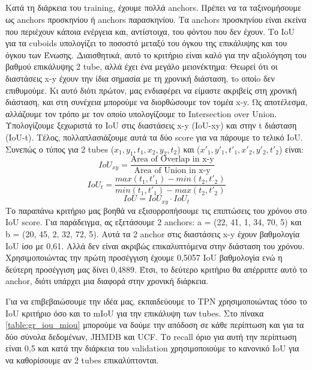 \subsection{ }
Κατά τη διάρκεια του \en training\gr, έχουμε πολλά \en anchors\gr. Πρέπει να τα ταξινομήσουμε ως \en anchors  \gr προσκηνίου ή
\en anchors \gr παρασκηνίου. Τα \en anchors \gr προσκηνίου είναι εκείνα που περιέχουν κάποια ενέργεια και, αντίστοιχα, του φόντου
που δεν έχουν. Tο \en IoU \gr για τα \en cuboids \gr υπολογίζει το ποσοστό μεταξύ του όγκου της επικάλυψης
και του όγκου των Ένωσης.
Διαισθητικά, αυτό το κριτήριο είναι καλό για την αξιολόγηση του βαθμού επικάλυψης 2 \en tube\gr, αλλά έχει ένα μεγάλο μειονέκτημα:
Θεωρεί ότι οι διαστάσεις \en x-y \gr έχουν την ίδια σημασία με τη χρονική διάσταση, τo οποίo δεν επιθυμούμε. Κι αυτό  διότι
πρώτον, μας ενδιαφέρει να είμαστε ακριβείς στη χρονική διάσταση, και στη συνέχεια μπορούμε να διορθώσουμε τον τομέα \en x-y\gr.
Ως αποτέλεσμα, αλλάζουμε τον τρόπο με τον οποίο υπολογίζουμε το \en Intersection over Union\gr. Υπολογίζουμε ξεχωριστά
το \en IoU \gr στις διαστάσεις \en x-y (IoU-xy) \gr και στην \en t \gr  διάσταση \en (IoU-t)\gr. Τέλος,  πολλαπλασιάζουμε αυτά τα δύο \en score
 \gr για να πάρουμε το τελικό \en IoU\gr.
Συνεπώς ο τύπος για 2 \en tubes ($x_1, y_1, t_1, x_2, y_2, t_2$) \gr  και \en  ($x'_1, y'_1, t'_1, x'_2, y'_2, t'_2$) \gr είναι:\en
\[ IoU_{xy} = \frac{ \text{Area of Overlap in x-y}} { \text{Area of Union in x-y}}  \]
\[ IoU_t = \frac { max(t_1, t'_1) - min(t_2, t'_2)} {min(t_1,t'_1) - max(t_2,t'_2)} \]
\[ IoU = IoU_{xy} \cdot  IoU_t \]
\gr Το παραπάνω κριτήριο μας βοηθά να εξισορροπήσουμε τις επιπτώσεις του χρόνου στο \en IoU score\gr. Για παράδειγμα, ας εξετάσουμε 2 \en anchors\gr:
\en a = (22, 41, 1, 34, 70, 5) \gr και \en  b = (20, 45, 2, 32, 72, 5)\gr. Αυτά τα 2 \en anchor \gr στις διαστάσεις \en  x-y \gr έχουν βαθμολογία \en IoU \gr ίσο με 0,61.
Αλλά δεν είναι ακριβώς επικαλυπτόμενα στην διάσταση του χρόνου. Χρησιμοποιώντας την πρώτη προσέγγιση έχουμε 0,5057 \en IoU \gr βαθμολογία ενώ η
δεύτερη προσέγγιση μας δίνει 0,4889. Έτσι, το δεύτερο κριτήριο θα απέρριπτε αυτό το \en  anchor\gr, διότι υπάρχει μια διαφορά στην χρονική διάρκεια. \par


Για να επιβεβαιώσουμε την ιδέα μας, εκπαιδεύουμε το \en TPN \gr χρησιμοποιώντας τόσο το \en IoU \gr κριτήριο όσο και το \en mIoU \gr  για την επικάλυψη των \en tubes\gr.
Στο πίνακα \ref{table:gr_iou_miou} μπορούμε να δούμε την απόδοση σε κάθε περίπτωση και για τα δύο σύνολα δεδομένων, \en JHMDB \gr και \en UCF\gr. Το \en recall \gr όριο για αυτή
την περίπτωση είναι 0,5 και κατά την διάρκεια του \en validation \gr χρησιμοποιούμε το κανονικό \en IoU \gr για να καθορίσουμε αν 2 \en tubes \gr επικαλύπτονται.

